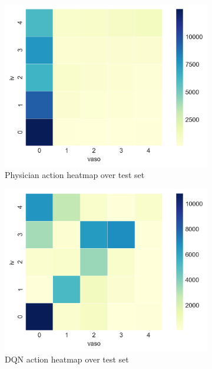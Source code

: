 \documentclass[letterpaper]{article}
\begin{document}
\begin{figure}[H]
  \centering
  \begin{subfigure}{0.5\linewidth}
  \centering
  \includegraphics[width=0.9\linewidth]{figures/phy_test_actions.png}\hfill
  \caption{Physician action heatmap over test set}
  \label{fig:phy_test_action}
  \end{subfigure}%
  \begin{subfigure}{0.5\linewidth}
  \centering
  \includegraphics[width=0.9\linewidth]{figures/agent_test_actions.png}\hfill
  \caption{DQN action heatmap over test set}
  \label{fig:agent_test_action}
  \end{subfigure}
  \begin{subfigure}{0.48\linewidth}
  \centering

\end{subfigure}
\end{figure}
\end{document}

